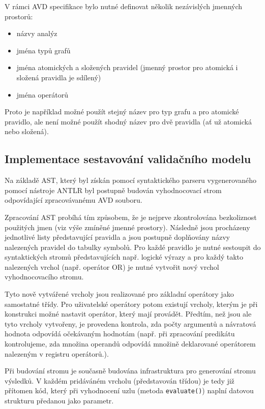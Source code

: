 V rámci AVD specifikace bylo nutné definovat několik nezávislých jmenných prostorů:

\begin{itemize}
\item názvy analýz
\item jména typů grafů
\item jména atomických a složených pravidel (jmenný prostor pro atomická i složená pravidla je sdílený)
\item jména operátorů
\end{itemize}

Proto je například možné použít stejný název pro typ grafu a pro atomické pravidlo, ale není možné použít shodný název pro dvě pravidla (ať už atomická nebo složená).

\subsection{Implementace sestavování validačního modelu}
Na základě AST, který byl získán pomocí syntaktického parseru vygenerovaného pomocí nástroje ANTLR byl postupně budován vyhodnocovací strom odpovídající zpracovávanému AVD souboru.

Zpracování AST probíhá tím způsobem, že je nejprve zkontrolována bezkoliznost použitých jmen (viz výše zmíněné jmenné prostory). Následně jsou procházeny jednotlivé listy představující pravidla a jsou postupně doplňovány názvy nalezených pravidel do tabulky symbolů. Pro každé pravidlo je nutné sestoupit do syntaktických stromů představujících např. logické výrazy a pro každý takto nalezených vrchol (např. operátor OR) je nutné vytvořit nový vrchol vyhodnocovacího stromu.

Tyto nově vytvářené vrcholy jsou realizované pro základní operátory jako samostatné třídy. Pro uživatelské operátory potom existují vrcholy, kterým je při konstrukci možné nastavit operátor, který mají provádět. Předtím, než jsou ale tyto vrcholy vytvořeny, je provedena kontrola, zda počty argumentů a návratová hodnota odpovídá očekávaným hodnotám (např. při zpracování predikátu kontrolujeme, zda množina operandů odpovídá množině deklarované operátorem nalezeným v registru operátorů.).

Při budování stromu je současně budována infrastruktura pro generování stromu výsledků. V každém pridáváném vrcholu (představován třídou) je tedy již přítomen kód, který při vyhodnocení uzlu (metoda \verb-evaluate()-) naplní datovou strukturu předanou jako parametr.

